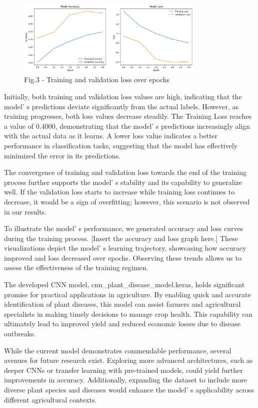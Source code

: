 \begin{figure}[H]
	\centering
	\includegraphics[width=0.8\textwidth]{media/ict/image32}
	\caption*{Fig.3 - Training and validation loss over epochs}
\end{figure}

\begin{multicols}{2}
Initially, both training and validation loss values are high, indicating
that the model' s predictions deviate significantly from
the actual labels. However, as training progresses, both loss values
decrease steadily. The Training Loss reaches a value of 0.4000,
demonstrating that the model' s predictions increasingly
align with the actual data as it learns. A lower loss value indicates a
better performance in classification tasks, suggesting that the model
has effectively minimized the error in its predictions.

The convergence of training and validation loss towards the end of the
training process further supports the model' s stability
and its capability to generalize well. If the validation loss starts to
increase while training loss continues to decrease, it would be a sign
of overfitting; however, this scenario is not observed in our results.

To illustrate the model' s performance, we generated
accuracy and loss curves during the training process. {[}Insert the
accuracy and loss graph here.{]} These visualizations depict the
model' s learning trajectory, showcasing how accuracy
improved and loss decreased over epochs. Observing these trends allows
us to assess the effectiveness of the training regimen.

The developed CNN model, cnn\_plant\_disease\_model.keras, holds
significant promise for practical applications in agriculture. By
enabling quick and accurate identification of plant diseases, this model
can assist farmers and agricultural specialists in making timely
decisions to manage crop health. This capability can ultimately lead to
improved yield and reduced economic losses due to disease outbreaks.

While the current model demonstrates commendable performance, several
avenues for future research exist. Exploring more advanced
architectures, such as deeper CNNs or transfer learning with pre-trained
models, could yield further improvements in accuracy. Additionally,
expanding the dataset to include more diverse plant species and diseases
would enhance the model' s applicability across different
agricultural contexts.


\end{multicols}
